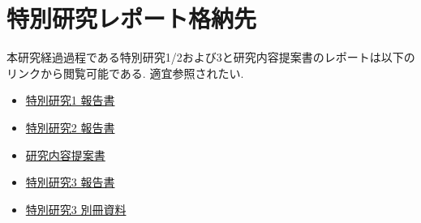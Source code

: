 \chapter{特別研究レポート格納先}
本研究経過過程である特別研究1/2および3と研究内容提案書のレポートは以下のリンクから閲覧可能である. 適宜参照されたい.
\begin{itemize}
  \item \href{https://drive.google.com/open?id=1cAxzPoKxxjQKVu29GLQ0nsldmYBtgDEn&usp=drive_fs}{特別研究1 報告書}
  \item \href{https://drive.google.com/open?id=14rU8VHIF_2HHVoE2twPA_s9i6qF9QqlJ&usp=drive_fs}{特別研究2 報告書}
  \item \href{https://drive.google.com/open?id=1cJ8v32mS4TthynS6yP99nYb8Sv3YQPLZ&usp=drive_fs}{研究内容提案書}
  \item \href{https://drive.google.com/open?id=1cLeL2UJFi6_QtMtjGqVr22aTDtoGnCT5&usp=drive_fs}{特別研究3 報告書}
  \item \href{https://drive.google.com/open?id=14ub9oX1HVd4acJh_h1ov97LJCkNjIwnq&usp=drive_fs}{特別研究3 別冊資料}
\end{itemize}
